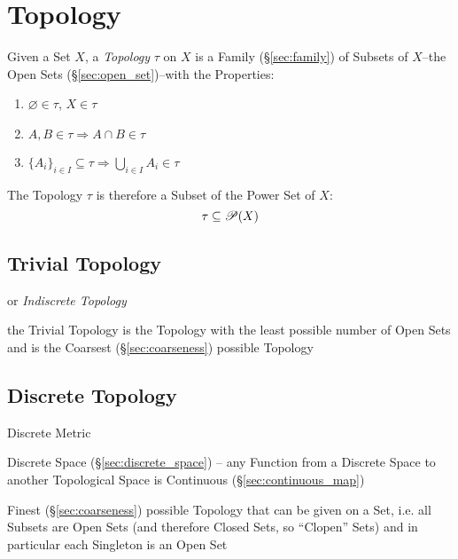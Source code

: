 \section{Topology}\label{sec:topology}

Given a Set $X$, a \emph{Topology} $\tau$ on $X$ is a Family
(\S\ref{sec:family}) of Subsets of $X$--the Open Sets
(\S\ref{sec:open_set})--with the Properties:
\begin{enumerate}
  \item $\varnothing \in \tau$, $X \in \tau$
  \item $A,B \in \tau \Rightarrow A \cap B \in \tau$
  \item $\{A_i\}_{i \in I} \subseteq \tau \Rightarrow \bigcup_{i \in
  I} A_i \in \tau$
\end{enumerate}
The Topology $\tau$ is therefore a Subset of the Power Set of $X$:
\[
  \tau \subseteq \mathscr{P}(X)
\]



\subsection{Trivial Topology}\label{sec:trivial_topology}

or \emph{Indiscrete Topology}

the Trivial Topology is the Topology with the least possible number of Open
Sets and is the Coarsest (\S\ref{sec:coarseness}) possible Topology



\subsection{Discrete Topology}\label{sec:discrete_topology}

Discrete Metric

Discrete Space (\S\ref{sec:discrete_space}) -- any Function from a Discrete
Space to another Topological Space is Continuous (\S\ref{sec:continuous_map})

Finest (\S\ref{sec:coarseness}) possible Topology that can be given on a Set,
i.e. all Subsets are Open Sets (and therefore Closed Sets, so ``Clopen'' Sets)
and in particular each Singleton is an Open Set

